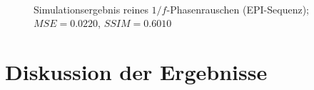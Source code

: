 \begin{figure}[H]
	\centering
	\
	\caption[Simulationsergebnis reines $1/f$-Phasenrauschen (EPI) (3)]{Simulationsergebnis reines $1/f$-Phasenrauschen (EPI-Sequenz); $MSE=0.0220$, $SSIM=0.6010$}
	\label{fig:res1overFepi3}	
\end{figure}

\section{Diskussion der Ergebnisse}

















